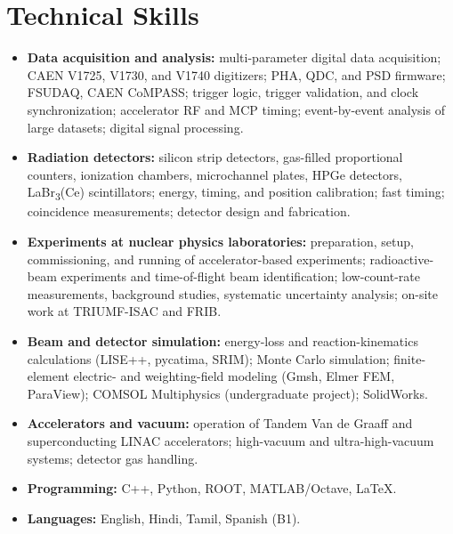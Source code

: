 \documentclass[10pt,letterpaper]{article}
\begin{document}
\section{Technical Skills}
\begin{itemize}
  \item \textbf{Data acquisition and analysis:} multi-parameter digital data acquisition; CAEN V1725, V1730, and V1740 digitizers; PHA, QDC, and PSD firmware; FSUDAQ, CAEN CoMPASS; trigger logic, trigger validation, and clock synchronization; accelerator RF and MCP timing; event-by-event analysis of large datasets; digital signal processing.
  \item \textbf{Radiation detectors:} silicon strip detectors, gas-filled proportional counters, ionization chambers, microchannel plates, HPGe detectors, LaBr\textsubscript{3}(Ce) scintillators; energy, timing, and position calibration; fast timing; coincidence measurements; detector design and fabrication.
  \item \textbf{Experiments at nuclear physics laboratories:} preparation, setup, commissioning, and running of accelerator-based experiments; radioactive-beam experiments and time-of-flight beam identification; low-count-rate measurements, background studies, systematic uncertainty analysis; on-site work at TRIUMF-ISAC and FRIB.
  \item \textbf{Beam and detector simulation:} energy-loss and reaction-kinematics calculations (LISE++, pycatima, SRIM); Monte Carlo simulation; finite-element electric- and weighting-field modeling (Gmsh, Elmer FEM, ParaView); COMSOL Multiphysics (undergraduate project); SolidWorks.
  \item \textbf{Accelerators and vacuum:} operation of Tandem Van de Graaff and superconducting LINAC accelerators; high-vacuum and ultra-high-vacuum systems; detector gas handling.
  \item \textbf{Programming:} C++, Python, ROOT, MATLAB/Octave, \LaTeX.
  \item \textbf{Languages:} English, Hindi, Tamil, Spanish (B1).
\end{itemize}

\end{document}
